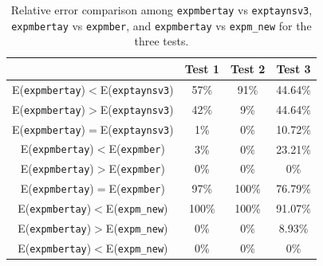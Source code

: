 \begin{table}[!t]\begin{center}
                \caption{Relative error comparison among \texttt{expmbertay} vs \texttt{exptaynsv3}, \texttt{expmbertay} vs \texttt{expmber}, and \texttt{expmbertay} vs \texttt{expm\_new} for the three tests.}
{\small
               \begin{tabular}{|c||c|c|c|}\hline & Test 1  &Test 2 & Test 3\\\hline
                        E(\texttt{expmbertay})$<$E(\texttt{exptaynsv3})    &   57\%  &   91\%  & 44.64\%\\\hline
                        E(\texttt{expmbertay})$>$E(\texttt{exptaynsv3})    &   42\%  &     9\%  & 44.64\%\\\hline
                        E(\texttt{expmbertay})$=$E(\texttt{exptaynsv3})    &     1\%  &     0\% &  10.72\%\\\hline
                        E(\texttt{expmbertay})$<$E(\texttt{expmber})       &     3\%  &     0\%  & 23.21\%\\\hline
                        E(\texttt{expmbertay})$>$E(\texttt{expmber})       &     0\%  &     0\%  &    0\%\\\hline
                        E(\texttt{expmbertay})$=$E(\texttt{expmber})       &   97\%  &  100\%  & 76.79\%\\\hline
                        E(\texttt{expmbertay})$<$E(\texttt{expm\_new})   & 100\%  & 100\%  &  91.07\%\\\hline
                        E(\texttt{expmbertay})$>$E(\texttt{expm\_new})   &    0\%  &     0\%  &  8.93\%\\\hline
                        E(\texttt{expmbertay})$<$E(\texttt{expm\_new})   &    0\%  &     0\%  &       0\%\\\hline
                \end{tabular}}
                \label{table_err_comparative_expmbertay}
        \end{center}
\end{table}


